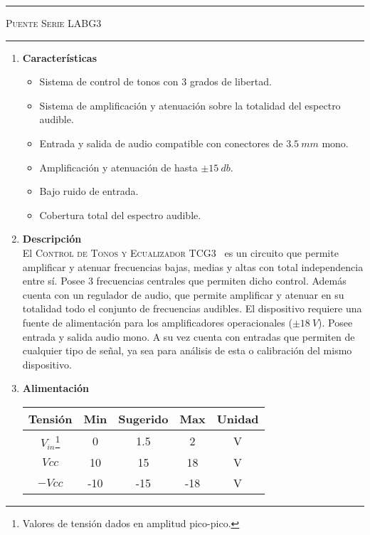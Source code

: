 



\begin{center}
\rule{\textwidth}{1pt}
\textsc{Puente Serie LABG3 \textsuperscript{\textregistered}}
\rule{\textwidth}{1pt}
\end{center}

\begin{multicols}{2}

\begin{enumerate}
	\item[1] \textbf{Características}
	\begin{itemize}
		\item Sistema de control de tonos con 3 grados de libertad.
		\item Sistema de amplificación y atenuación sobre la totalidad del espectro audible.
		\item Entrada y salida de audio compatible con conectores de $3.5 \ mm$ mono.
		\item Amplificación y atenuación de hasta $\pm 15 \ db$.
		\item Bajo ruido de entrada.
		\item Cobertura total del espectro audible.
	\end{itemize}
	
	\item[2] \textbf{Descripción}\\
		El \textsc{Control de Tonos y Ecualizador TCG3~\textsuperscript{\textregistered}} es un circuito que permite amplificar y atenuar frecuencias bajas, medias y altas con total independencia entre sí. Posee 3 frecuencias centrales que permiten dicho control. Además cuenta con un regulador de audio, que permite amplificar y atenuar en su totalidad todo el conjunto de frecuencias audibles. El dispositivo requiere una fuente de alimentación para los amplificadores operacionales ($\pm 18 \ V$). Posee entrada y salida audio mono. A su vez cuenta con entradas que permiten de cualquier tipo de señal, ya sea para análisis de esta o calibración del mismo dispositivo.
	
	\item[3] \textbf{Alimentación}
	\begin{table}[H]
		\begin{tabular}{ccccc}
			\hline	
			Tensión & Min & Sugerido & Max & Unidad \\
			\hline
			$V_{in}$\footnote{Valores de tensión dados en amplitud pico-pico.}    & 0 	& 1.5		   & 2	 	& V \\
			$Vcc$       & 10  	& 15       & 18 	& V \\
			$-Vcc$      & -10 	& -15      & -18 	& V	\\
			\hline
		\end{tabular}
	\end{table}
		

\end{enumerate}
\end{multicols}
